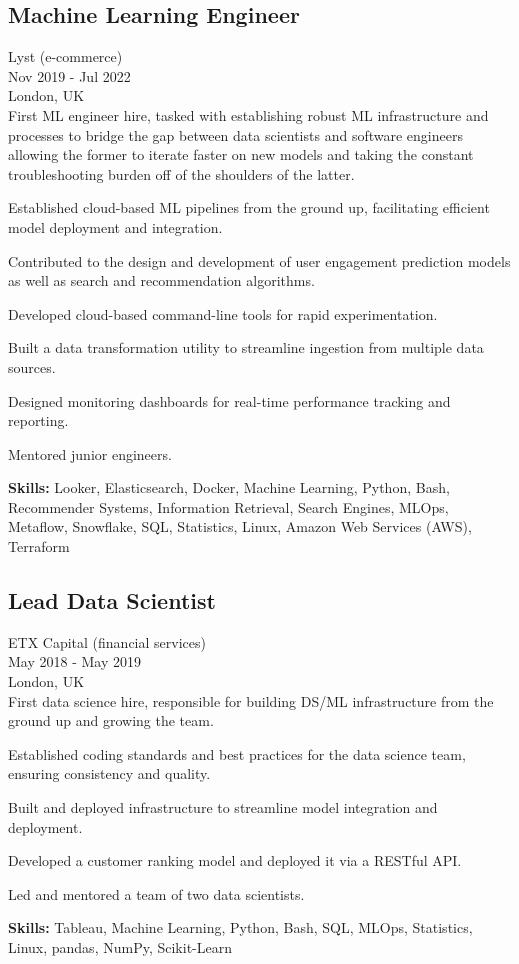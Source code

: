 \documentclass[a4paper,10pt]{article}
\begin{document}
\subsection*{Machine Learning Engineer}
Lyst (e-commerce) \\
Nov 2019 - Jul 2022 \\
London, UK \\
First ML engineer hire, tasked with establishing robust ML infrastructure and processes to bridge the gap between data scientists and software engineers allowing the former to iterate faster on new models and taking the constant troubleshooting burden off of the shoulders of the latter.
\begin{bulletlist}
    \item Established cloud-based ML pipelines from the ground up, facilitating efficient model deployment and integration.
    \item Contributed to the design and development of user engagement prediction models as well as search and recommendation algorithms.
    \item Developed cloud-based command-line tools for rapid experimentation.
    \item Built a data transformation utility to streamline ingestion from multiple data sources.
    \item Designed monitoring dashboards for real-time performance tracking and reporting.
    \item Mentored junior engineers.
\end{bulletlist}
\textbf{Skills:} Looker, Elasticsearch, Docker, Machine Learning, Python, Bash, Recommender Systems, Information Retrieval, Search Engines, MLOps, Metaflow, Snowflake, SQL, Statistics, Linux, Amazon Web Services (AWS), Terraform

\subsection*{Lead Data Scientist}
ETX Capital (financial services) \\
May 2018 - May 2019 \\
London, UK \\
First data science hire, responsible for building DS/ML infrastructure from the ground up and growing the team.
\begin{bulletlist}
    \item Established coding standards and best practices for the data science team, ensuring consistency and quality.
    \item Built and deployed infrastructure to streamline model integration and deployment.
    \item Developed a customer ranking model and deployed it via a RESTful API.
    \item Led and mentored a team of two data scientists.
\end{bulletlist}
\textbf{Skills: }Tableau, Machine Learning, Python, Bash, SQL, MLOps, Statistics, Linux, pandas, NumPy, Scikit-Learn
\end{document}
